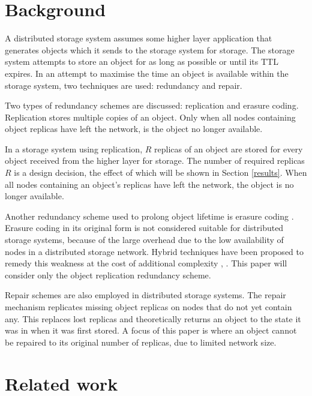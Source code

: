 \documentclass[10pt,a4paper,conference]{IEEEtran}
\begin{document}
\section{Background}
\label{background}

A distributed storage system assumes some higher layer application that generates objects which it sends to the storage system for storage. The storage system attempts to store an object for as long as possible or until its TTL expires. In an attempt to maximise the time an object is available within the storage system, two techniques are used: redundancy and repair.

Two types of redundancy schemes are discussed: replication and erasure coding. Replication stores multiple copies of an object. Only when all nodes containing object replicas have left the network, is the object no longer available.

In a storage system using replication, $R$ replicas of an object are stored for every object received from the higher layer for storage. The number of required replicas $R$ is a design decision, the effect of which will be shown in Section \ref{results}. When all nodes containing an object's replicas have left the network, the object is no longer available.

Another redundancy scheme used to prolong object lifetime is erasure coding \cite{erasure_codes}. Erasure coding in its original form is not considered suitable for distributed storage systems, because of the large overhead due to the low availability of nodes in a distributed storage network. Hybrid techniques have been proposed to remedy this weakness at the cost of additional complexity \cite{erasure_coding_vs_replication}, \cite{erasure_code_improvements}. This paper will consider only the object replication redundancy scheme.

Repair schemes are also employed in distributed storage systems. The repair mechanism replicates missing object replicas on nodes that do not yet contain any. This replaces lost replicas and theoretically returns an object to the state it was in when it was first stored. A focus of this paper is where an object cannot be repaired to its original number of replicas, due to limited network size.

\section{Related work}
\label{related_work}
\end{document}
